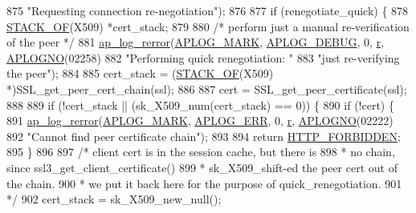 \begin{DoxyCode}
{{875                       \textcolor{stringliteral}{"Requesting connection re-negotiation"});
876 
877         \textcolor{keywordflow}{if} (renegotiate\_quick) \{
878             \hyperlink{ssl__engine__init_8c_a8d3ef5dbf93a046b44c0a610b5325b45}{STACK\_OF}(X509) *cert\_stack;
879 
880             \textcolor{comment}{/* perform just a manual re-verification of the peer */}
881             \hyperlink{group__APACHE__CORE__LOG_ga4c112558ccffd6b363da102b2052d2a6}{ap\_log\_rerror}(\hyperlink{group__APACHE__CORE__LOG_ga655e126996849bcb82e4e5a14c616f4a}{APLOG\_MARK}, \hyperlink{group__APACHE__CORE__LOG_gadfcef90537539cf2b7d35cfbbbafeb93}{APLOG\_DEBUG}, 0, 
      \hyperlink{group__APACHE__CORE__CONFIG_ga091cdd45984e865a888a4f8bb8fe107a}{r}, \hyperlink{group__APACHE__CORE__LOG_ga1dee8a07e06bc5b3de8b89662c2cd666}{APLOGNO}(02258)
882                          \textcolor{stringliteral}{"Performing quick renegotiation: "}
883                          \textcolor{stringliteral}{"just re-verifying the peer"});
884 
885             cert\_stack = (\hyperlink{ssl__engine__init_8c_a8d3ef5dbf93a046b44c0a610b5325b45}{STACK\_OF}(X509) *)SSL\_get\_peer\_cert\_chain(ssl);
886 
887             cert = SSL\_get\_peer\_certificate(ssl);
888 
889             \textcolor{keywordflow}{if} (!cert\_stack || (sk\_X509\_num(cert\_stack) == 0)) \{
890                 \textcolor{keywordflow}{if} (!cert) \{
891                     \hyperlink{group__APACHE__CORE__LOG_ga4c112558ccffd6b363da102b2052d2a6}{ap\_log\_rerror}(\hyperlink{group__APACHE__CORE__LOG_ga655e126996849bcb82e4e5a14c616f4a}{APLOG\_MARK}, \hyperlink{group__APACHE__CORE__LOG_ga57ad94ed8c92c4306de90479251a5d58}{APLOG\_ERR}, 0, 
      \hyperlink{group__APACHE__CORE__CONFIG_ga091cdd45984e865a888a4f8bb8fe107a}{r}, \hyperlink{group__APACHE__CORE__LOG_ga1dee8a07e06bc5b3de8b89662c2cd666}{APLOGNO}(02222)
892                                   \textcolor{stringliteral}{"Cannot find peer certificate chain"});
893 
894                     \textcolor{keywordflow}{return} \hyperlink{group__HTTP__Status_ga92646f876056a1e5013e0050496dc04d}{HTTP\_FORBIDDEN};
895                 \}
896 
897                 \textcolor{comment}{/* client cert is in the session cache, but there is}
898 \textcolor{comment}{                 * no chain, since ssl3\_get\_client\_certificate()}
899 \textcolor{comment}{                 * sk\_X509\_shift-ed the peer cert out of the chain.}
900 \textcolor{comment}{                 * we put it back here for the purpose of quick\_renegotiation.}
901 \textcolor{comment}{                 */}
902                 cert\_stack = sk\_X509\_new\_null();
}}
\end{DoxyCode}
